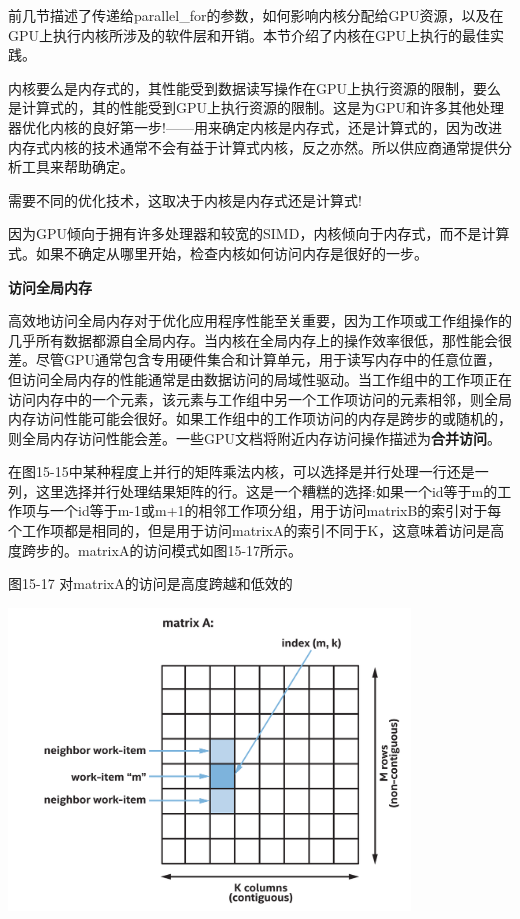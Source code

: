 前几节描述了传递给parallel\_for的参数，如何影响内核分配给GPU资源，以及在GPU上执行内核所涉及的软件层和开销。本节介绍了内核在GPU上执行的最佳实践。\par

内核要么是内存式的，其性能受到数据读写操作在GPU上执行资源的限制，要么是计算式的，其的性能受到GPU上执行资源的限制。这是为GPU和许多其他处理器优化内核的良好第一步!——用来确定内核是内存式，还是计算式的，因为改进内存式内核的技术通常不会有益于计算式内核，反之亦然。所以供应商通常提供分析工具来帮助确定。\par

\begin{tcolorbox}[colback=red!5!white,colframe=red!75!black]
需要不同的优化技术，这取决于内核是内存式还是计算式!
\end{tcolorbox}

因为GPU倾向于拥有许多处理器和较宽的SIMD，内核倾向于内存式，而不是计算式。如果不确定从哪里开始，检查内核如何访问内存是很好的一步。\par

\hspace*{\fill} \par %
\textbf{访问全局内存}

高效地访问全局内存对于优化应用程序性能至关重要，因为工作项或工作组操作的几乎所有数据都源自全局内存。当内核在全局内存上的操作效率很低，那性能会很差。尽管GPU通常包含专用硬件集合和计算单元，用于读写内存中的任意位置，但访问全局内存的性能通常是由数据访问的局域性驱动。当工作组中的工作项正在访问内存中的一个元素，该元素与工作组中另一个工作项访问的元素相邻，则全局内存访问性能可能会很好。如果工作组中的工作项访问的内存是跨步的或随机的，则全局内存访问性能会差。一些GPU文档将附近内存访问操作描述为\textbf{合并访问}。\par

在图15-15中某种程度上并行的矩阵乘法内核，可以选择是并行处理一行还是一列，这里选择并行处理结果矩阵的行。这是一个糟糕的选择:如果一个id等于m的工作项与一个id等于m-1或m+1的相邻工作项分组，用于访问matrixB的索引对于每个工作项都是相同的，但是用于访问matrixA的索引不同于K，这意味着访问是高度跨步的。matrixA的访问模式如图15-17所示。\par

\hspace*{\fill} \par %
图15-17 对matrixA的访问是高度跨越和低效的
\begin{center}
	\includegraphics[width=0.8\textwidth]{content/chapter-15/images/13}
\end{center}

